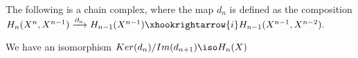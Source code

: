 \begin{theorem}
The following is a chain complex, where the map $d_n$ is defined as the composition $H_n(X^n,X^{n-1})\xrightarrow{\partial_n}H_{n-1}(X^{n-1})\xhookrightarrow{i} H_{n-1}(X^{n-1},X^{n-2}).$


We have an isomorphism $Ker(d_n)/Im(d_{n+1})  \iso H_n(X)$
\end{theorem}


